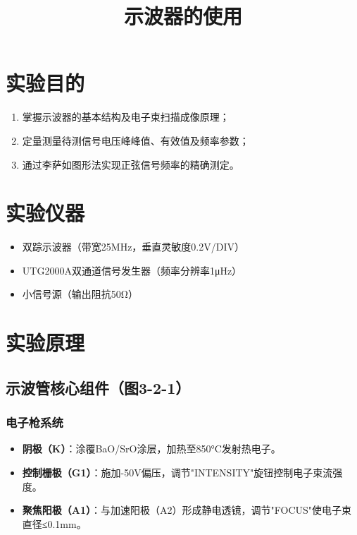 \documentclass[12pt,a4paper]{article}
\title{\textbf{示波器的使用}}
\author{}
\date{}
\begin{document}
\maketitle

\section{实验目的}

\begin{enumerate}
\item 掌握示波器的基本结构及电子束扫描成像原理；
\item 定量测量待测信号电压峰峰值、有效值及频率参数；
\item 通过李萨如图形法实现正弦信号频率的精确测定。
\end{enumerate}

\section{实验仪器}

\begin{itemize}
\item 双踪示波器（带宽25MHz，垂直灵敏度0.2V/DIV）
\item UTG2000A双通道信号发生器（频率分辨率1μHz）
\item 小信号源（输出阻抗50Ω）
\end{itemize}

\section{实验原理}

\subsection{示波管核心组件（图3-2-1）}

\subsubsection{电子枪系统}

\begin{itemize}
\item \textbf{阴极（K）}：涂覆BaO/SrO涂层，加热至850°C发射热电子。
\item \textbf{控制栅极（G1）}：施加-50V偏压，调节"INTENSITY"旋钮控制电子束流强度。
\item \textbf{聚焦阳极（A1）}：与加速阳极（A2）形成静电透镜，调节"FOCUS"使电子束直径≤0.1mm。
\end{itemize}
\end{document}
